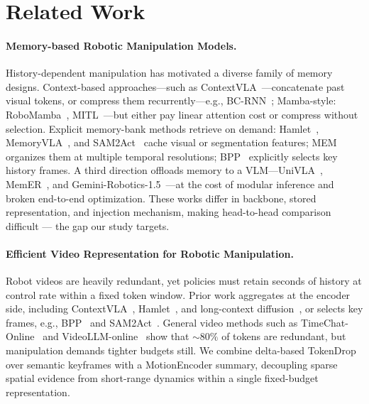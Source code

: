 \documentclass{article}
\begin{document}
\section{Related Work}
\label{sec:related}

\paragraph{Memory-based Robotic Manipulation Models.}
History-dependent manipulation has motivated a diverse family of memory
designs. Context-based approaches---such as ContextVLA~\citep{jang2025contextvla}---concatenate past visual tokens,
or compress them recurrently---e.g., BC-RNN~\citep{mandlekar2021bcrnn}; Mamba-style: RoboMamba~\citep{liu2024robomamba},
MITL~\citep{mitl2025}---but either pay linear attention cost or compress
without selection. Explicit memory-bank methods retrieve on demand:
Hamlet~\citep{koo2025hamlet}, MemoryVLA~\citep{shi2026memoryvla}, and
SAM2Act~\citep{fang2025sam2act} cache visual or segmentation features;
MEM~\citep{physicalintelligence2026mem} organizes them at multiple temporal
resolutions; BPP~\citep{sobol2026bpp} explicitly selects key history frames.
A third direction offloads memory to a VLM---UniVLA~\citep{bu2025univla},
MemER~\citep{sridhar2025memer}, and Gemini-Robotics-1.5~\citep{geminiroboticsTeam2025gemini15}---at
the cost of modular inference and broken end-to-end optimization. These
works differ in backbone, stored representation, and injection mechanism,
making head-to-head comparison difficult --- the gap our study targets.

\paragraph{Efficient Video Representation for Robotic Manipulation.}
Robot videos are heavily redundant, yet policies must retain seconds of
history at control rate within a fixed token window. Prior work aggregates
at the encoder side, including ContextVLA~\citep{jang2025contextvla},
Hamlet~\citep{koo2025hamlet}, and long-context diffusion~\citep{torne2025longcontext},
or selects key frames, e.g., BPP~\citep{sobol2026bpp} and SAM2Act~\citep{fang2025sam2act}.
General video methods such as TimeChat-Online~\citep{yao2025timechat}
and VideoLLM-online~\citep{chen2024videollmonline} show that ${\sim}80\%$ of
tokens are redundant, but manipulation demands tighter budgets still. We
combine delta-based TokenDrop over semantic keyframes with a MotionEncoder
summary, decoupling sparse spatial evidence from short-range dynamics within
a single fixed-budget representation.
\end{document}
